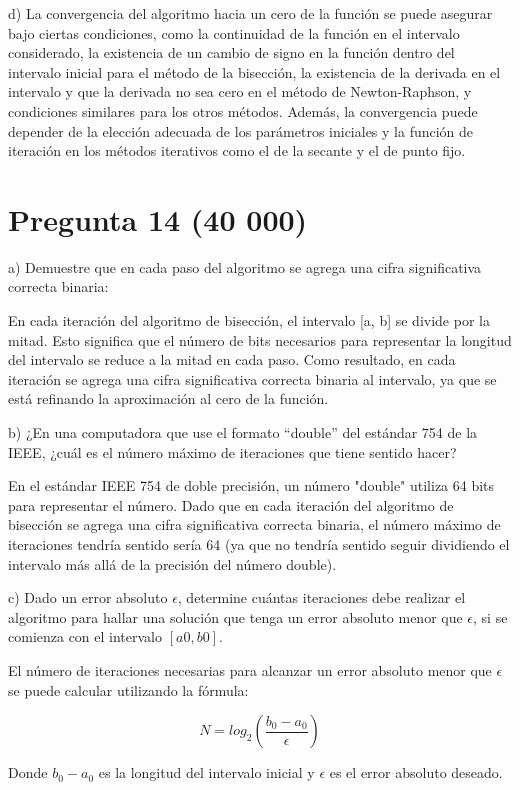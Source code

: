 \documentclass[a4paper,12pt]{article}
\begin{document}
d) La convergencia del algoritmo hacia un cero de la función se puede asegurar bajo ciertas condiciones, como la continuidad de la función en el intervalo considerado, la existencia de un cambio de signo en la función dentro del intervalo inicial para el método de la bisección, la existencia de la derivada en el intervalo y que la derivada no sea cero en el método de Newton-Raphson, y condiciones similares para los otros métodos. Además, la convergencia puede depender de la elección adecuada de los parámetros iniciales y la función de iteración en los métodos iterativos como el de la secante y el de punto fijo.


\section*{Pregunta 14 (40 000)}
a) Demuestre que en cada paso del algoritmo se agrega una cifra significativa correcta binaria:

En cada iteración del algoritmo de bisección, el intervalo [a, b] se divide por la mitad. Esto significa que el número de bits necesarios para representar la longitud del intervalo se reduce a la mitad en cada paso. Como resultado, en cada iteración se agrega una cifra significativa correcta binaria al intervalo, ya que se está refinando la aproximación al cero de la función.

b) ¿En una computadora que use el formato “double” del estándar 754 de la IEEE, ¿cuál es el número máximo de iteraciones que tiene sentido hacer?

En el estándar IEEE 754 de doble precisión, un número "double" utiliza 64 bits para representar el número. Dado que en cada iteración del algoritmo de bisección se agrega una cifra significativa correcta binaria, el número máximo de iteraciones tendría sentido sería 64 (ya que no tendría sentido seguir dividiendo el intervalo más allá de la precisión del número double).

c) Dado un error absoluto $\epsilon$, determine cuántas iteraciones debe realizar el algoritmo para hallar una solución que tenga un error absoluto menor que $\epsilon$, si se comienza con el intervalo $[a0, b0]$.

El número de iteraciones necesarias para alcanzar un error absoluto menor que $\epsilon$ se puede calcular utilizando la fórmula:

\[N = log_2 (\frac{b_0 - a_0}{\epsilon})\]

Donde \( b_0 - a_0 \) es la longitud del intervalo inicial y \( \epsilon \) es el error absoluto deseado.
\end{document}

